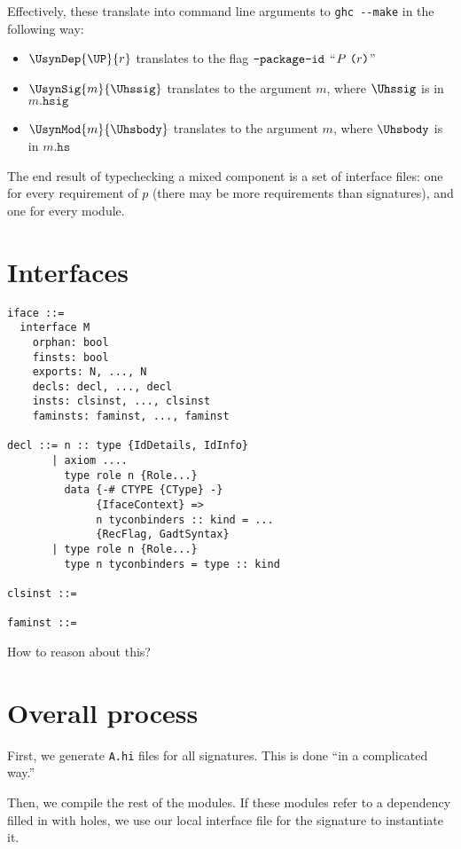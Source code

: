 \noindent
Effectively, these translate into command line arguments to \verb|ghc --make|
in the following way:

\begin{itemize}
    \item $\UsynDep{\UP}{r}$ translates to the flag $\verb|-package-id|$ ``$P~\verb|(|r\verb|)|$''
    \item $\UsynSig{m}{\Uhssig}$ translates to the argument $m$, where $\Uhssig$ is in $m\mathtt{.hsig}$
    \item $\UsynMod{m}{\Uhsbody}$ translates to the argument $m$, where $\Uhsbody$ is in $m\mathtt{.hs}$
\end{itemize}

\noindent
The end result of typechecking a mixed component is a set of interface
files: one for every requirement of $p$ (there may be more requirements
than signatures), and one for every module.

\section{Interfaces}

\begin{verbatim}
iface ::=
  interface M
    orphan: bool
    finsts: bool
    exports: N, ..., N
    decls: decl, ..., decl
    insts: clsinst, ..., clsinst
    faminsts: faminst, ..., faminst

decl ::= n :: type {IdDetails, IdInfo}
       | axiom ....
         type role n {Role...}
         data {-# CTYPE {CType} -}
              {IfaceContext} =>
              n tyconbinders :: kind = ...
              {RecFlag, GadtSyntax}
       | type role n {Role...}
         type n tyconbinders = type :: kind

clsinst ::=

faminst ::=
\end{verbatim}

How to reason about this?

\section{Overall process}

First, we generate \verb|A.hi| files for all signatures.  This
is done ``in a complicated way.''

Then, we compile the rest of the modules.  If these modules refer
to a dependency filled in with holes, we use our local interface
file for the signature to instantiate it.

